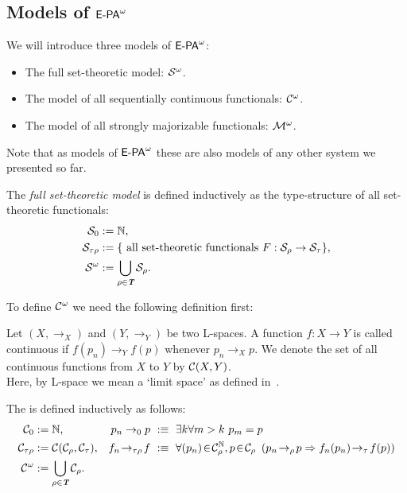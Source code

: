 \subsection{Models of ${\textsf{\upshape E-PA}}^\omega$}
%
%
%
%
We will introduce three models of ${\textsf{\upshape E-PA}}^\omega$:
\begin{itemize}
\item The full set-theoretic model: $\mathcal{S} ^\omega$.
\item The model of all sequentially continuous functionals: $\mathcal{C} ^\omega$.
\item The model of all strongly majorizable functionals: $\mathcal{M} ^\omega$.
\end{itemize}
Note that as models of ${\textsf{\upshape E-PA}}^\omega$ these are also models of any other system
we presented so far.
%
\begin{dfn}The {\em full set-theoretic model} is defined inductively
as the type-structure of all set-theoretic functionals:
\setcounter{equation}{0}
\begin{align}
\mathcal{S} _0&:=\mathbb{N}\text{,}\\
\mathcal{S} _{\tau\rho}&:=\{\text{ all set-theoretic functionals } F:\mathcal{S} _\rho\rightarrow\mathcal{S} _\tau\}\text{,}\\
\mathcal{S} ^\omega&:=\bigcup_{\rho\in\emph{\protect\textbf{T}}}\mathcal{S} _\rho
\text{.}
\end{align}
\end{dfn}
%
%
%
To define $\mathcal{C} ^\omega$ we need the following definition first:
\begin{dfn}
Let $(X,\rightarrow_X)$ and $(Y,\rightarrow_Y)$ be two L-spaces. A function $f:X\rightarrow Y$
is called continuous if $f(p_n)\rightarrow_Y f(p)$ whenever $p_n\rightarrow_X p$. We denote
the set of all continuous functions from $X$ to $Y$ by $\mathcal{C} (X,Y)$.\\
Here, by L-space we mean a `limit space' as defined in~\cite{Kuratowski52}.
\end{dfn}
%
\begin{dfn}{\bf\cite{Scarpellini71}} The  is defined inductively
as follows:
\setcounter{equation}{0}
\begin{align}
\ContO_0&:=\NN\text{,} & p_n\rightarrow_0 p\ &:\equiv\ \exists k\forall m>k\ p_m=p\\
\ContO_{\tau\rho}&:=\ContO(\ContO_\rho, \ContO_\tau)\text{,} &
  f_n\!\rightarrow_{\tau\rho}\! f\ &:\equiv\ \forall (p_n)\!\in\!\ContO^\NN_\rho,p\!\in\!\ContO_\rho\ 
                  \left(p_n\!\rightarrow_\rho\! p\Rightarrow f_n(p_n)\!\rightarrow_\tau\! f(p)\right)\\
\Cont&:=\bigcup_{\rho\in\Tp}\ContO_\rho\text{.} & &
\end{align}
\end{dfn}

